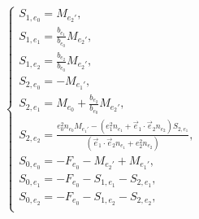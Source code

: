 \begin{equation*}
\left\{\begin{array}{l}
	S_{1,{e_0}} = M_{e_2'},\\
	S_{1,{e_1}} = \frac{b_{e_1}}{b_{e_0}} M_{e_2'}, \\
	S_{1,{e_2}} = \frac{b_{e_2}}{b_{e_0}} M_{e_2'}, \\
	
	S_{2,{e_0}} = -M_{e_1'},\\
	S_{2,{e_1}} = M_{e_0} + \frac{b_{e_2}}{b_{e_0}} M_{e_2'},\\
	
	S_{2,{e_2}} 
	= 
	\frac{
		e_0^2 n_{e_0} M_{e_1'}
		- \left( e_1^2 n_{e_1} + \vec e_1 \cdot \vec e_2 n_{e_2} \right) S_{2,{e_1}}
	}
	{\left( \vec e_1 \cdot \vec e_2 n_{e_1} + e_2^2 n_{e_2} \right)}
	, \\

	S_{0,{e_0}} = - F_{e_0} - M_{e_2'} + M_{e_1'},\\
	S_{0,{e_1}} = - F_{e_0} - S_{1,{e_1}} - S_{2,{e_1}},\\
	S_{0,{e_2}} = - F_{e_0} - S_{1,{e_2}} - S_{2,{e_2}},\\

\end{array}\right.
\end{equation*}

